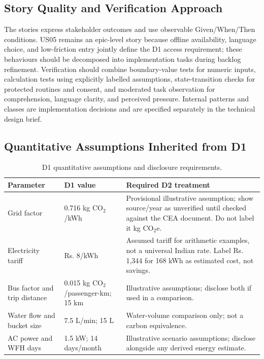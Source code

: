 \documentclass[12pt,a4paper]{article}
\begin{document}
\subsection{Story Quality and Verification Approach}
The stories express stakeholder outcomes and use observable Given/When/Then conditions. US05 remains an epic-level story because offline availability, language choice, and low-friction entry jointly define the D1 access requirement; these behaviours should be decomposed into implementation tasks during backlog refinement. Verification should combine boundary-value tests for numeric inputs, calculation tests using explicitly labelled assumptions, state-transition checks for protected routines and consent, and moderated task observation for comprehension, language clarity, and perceived pressure. Internal patterns and classes are implementation decisions and are specified separately in the technical design brief.


\subsection{Quantitative Assumptions Inherited from D1}
\begin{table}[ht]
\centering
\small
\caption{D1 quantitative assumptions and disclosure requirements.}
\begin{tabularx}{\textwidth}{@{}p{3.1cm}p{3.2cm}X@{}}
\toprule
\textbf{Parameter} & \textbf{D1 value} & \textbf{Required D2 treatment}\\
\midrule
Grid factor & 0.716 kg CO$_2$/kWh & Provisional illustrative assumption; show source/year as unverified until checked against the CEA document. Do not label it kg CO$_2$e.\\
Electricity tariff & Rs. 8/kWh & Assumed tariff for arithmetic examples, not a universal Indian rate. Label Rs. 1,344 for 168 kWh as estimated cost, not savings.\\
Bus factor and trip distance & 0.015 kg CO$_2$/passenger-km; 15 km & Illustrative assumptions; disclose both if used in a comparison.\\
Water flow and bucket size & 7.5 L/min; 15 L & Water-volume comparison only; not a carbon equivalence.\\
AC power and WFH days & 1.5 kW; 14 days/month & Illustrative scenario assumptions; disclose alongside any derived energy estimate.\\
\bottomrule
\end{tabularx}
\end{table}
\end{document}
